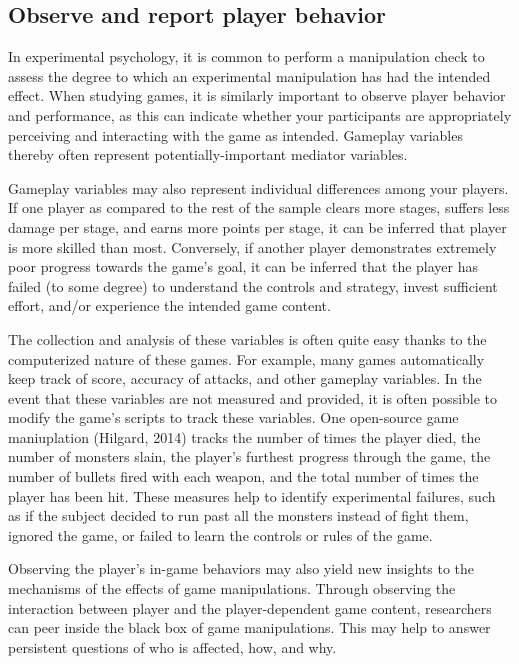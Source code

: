 \subsection{Observe and report player behavior} In experimental psychology, it is common to perform a manipulation check to assess the degree to which an experimental manipulation has had the intended effect. When studying games, it is similarly important to observe player behavior and performance, as this can indicate whether your participants are appropriately perceiving and interacting with the game as intended. Gameplay variables thereby often represent potentially-important mediator variables.

Gameplay variables may also represent individual differences among your players. If one player as compared to the rest of the sample clears more stages, suffers less damage per stage, and earns more points per stage, it can be inferred that player is more skilled than most. Conversely, if another player demonstrates extremely poor progress towards the game’s goal, it can be inferred that the player has failed (to some degree) to understand the controls and strategy, invest sufficient effort, and/or experience the intended game content. 

The collection and analysis of these variables is often quite easy thanks to the computerized nature of these games. For example, many games automatically keep track of score, accuracy of attacks, and other gameplay variables. In the event that these variables are not measured and provided, it is often possible to modify the game’s scripts to track these variables. One open-source game maniuplation (Hilgard, 2014) tracks the number of times the player died, the number of monsters slain, the player’s furthest progress through the game, the number of bullets fired with each weapon, and the total number of times the player has been hit. These measures help to identify experimental failures, such as if the subject decided to run past all the monsters instead of fight them, ignored the game, or failed to learn the controls or rules of the game.

Observing the player’s in-game behaviors may also yield new insights to the mechanisms of the effects of game manipulations. Through observing the interaction between player and the player-dependent game content, researchers can peer inside the black box of game manipulations. This may help to answer persistent questions of who is affected, how, and why.

